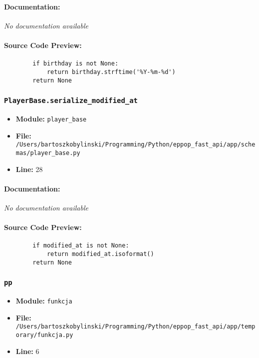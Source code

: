 \documentclass[11pt,a4paper]{article}
\begin{document}
\paragraph{Documentation:} \textit{No documentation available}

\paragraph{Source Code Preview:}
\begin{verbatim}
        if birthday is not None:
            return birthday.strftime('%Y-%m-%d')
        return None
\end{verbatim}

\vspace{1em}
\subsubsection{\texttt{PlayerBase.serialize\_modified\_at}}

\begin{itemize}
    \item \textbf{Module:} \texttt{player\_base}
    \item \textbf{File:} \texttt{/Users/bartoszkobylinski/Programming/Python/eppop\_fast\_api/app/schemas/player\_base.py}
    \item \textbf{Line:} 28
\end{itemize}

\paragraph{Documentation:} \textit{No documentation available}

\paragraph{Source Code Preview:}
\begin{verbatim}
        if modified_at is not None:
            return modified_at.isoformat()
        return None
\end{verbatim}

\vspace{1em}
\subsubsection{\texttt{pp}}

\begin{itemize}
    \item \textbf{Module:} \texttt{funkcja}
    \item \textbf{File:} \texttt{/Users/bartoszkobylinski/Programming/Python/eppop\_fast\_api/app/temporary/funkcja.py}
    \item \textbf{Line:} 6
\end{itemize}
\end{document}
